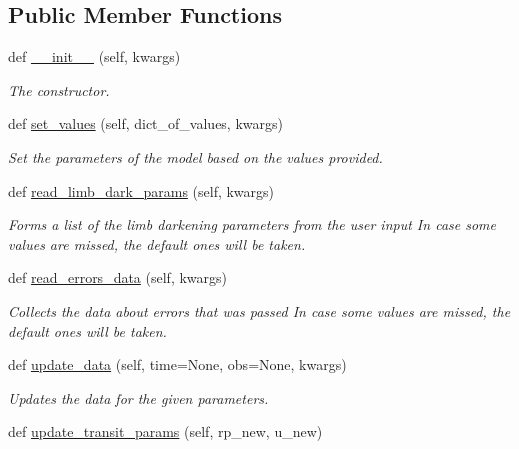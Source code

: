 \subsection*{Public Member Functions}
\begin{DoxyCompactItemize}
\item 
def \hyperlink{classexospec_1_1_transit_model_1_1_transit_model_a8e145f1b5965295abcc770f0e72a41b8}{\+\_\+\+\_\+init\+\_\+\+\_\+} (self, kwargs)
\begin{DoxyCompactList}\small\item\em The constructor. \end{DoxyCompactList}\item 
def \hyperlink{classexospec_1_1_transit_model_1_1_transit_model_a1b5933b7cc1aebd32d34beb3df63859a}{set\+\_\+values} (self, dict\+\_\+of\+\_\+values, kwargs)
\begin{DoxyCompactList}\small\item\em Set the parameters of the model based on the values provided. \end{DoxyCompactList}\item 
def \hyperlink{classexospec_1_1_transit_model_1_1_transit_model_ae9e15083b2e989276c67122e8effdc8a}{read\+\_\+limb\+\_\+dark\+\_\+params} (self, kwargs)
\begin{DoxyCompactList}\small\item\em Forms a list of the limb darkening parameters from the user input In case some values are missed, the default ones will be taken. \end{DoxyCompactList}\item 
def \hyperlink{classexospec_1_1_transit_model_1_1_transit_model_a0cc09d939ecb7742b40e33ca870e73ad}{read\+\_\+errors\+\_\+data} (self, kwargs)
\begin{DoxyCompactList}\small\item\em Collects the data about errors that was passed In case some values are missed, the default ones will be taken. \end{DoxyCompactList}\item 
def \hyperlink{classexospec_1_1_transit_model_1_1_transit_model_a282c211d47894b6b9849fd4bd254b696}{update\+\_\+data} (self, time=None, obs=None, kwargs)
\begin{DoxyCompactList}\small\item\em Updates the data for the given parameters. \end{DoxyCompactList}\item 
def \hyperlink{classexospec_1_1_transit_model_1_1_transit_model_a52dd74eef56c0dbb71cb662f684b6182}{update\+\_\+transit\+\_\+params} (self, rp\+\_\+new, u\+\_\+new)

\end{DoxyCompactItemize}
